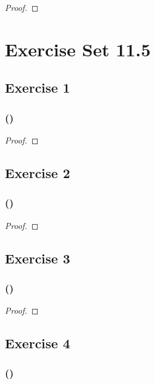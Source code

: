 \documentclass[14pt]{extarticle}
\begin{document}
\begin{proof}

\end{proof}

\section{Exercise Set 11.5}

\subsection{Exercise 1}

\subsubsection{()}

\begin{proof}

\end{proof}

\subsection{Exercise 2}

\subsubsection{()}

\begin{proof}

\end{proof}

\subsection{Exercise 3}

\subsubsection{()}

\begin{proof}

\end{proof}

\subsection{Exercise 4}

\subsubsection{()}
\end{document}
